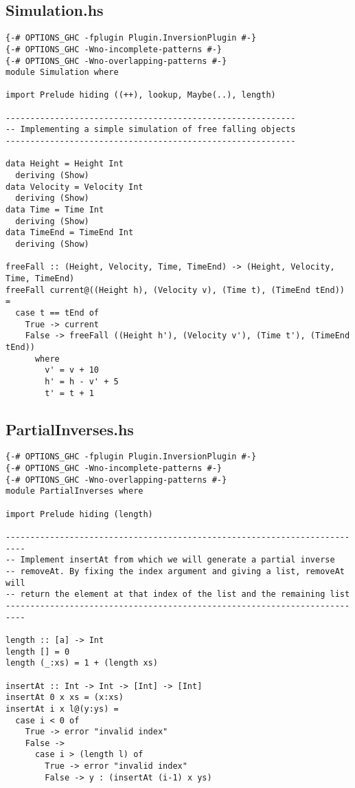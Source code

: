 \subsection{Simulation.hs}
\label{A:sim}

\begin{verbatim}
{-# OPTIONS_GHC -fplugin Plugin.InversionPlugin #-}
{-# OPTIONS_GHC -Wno-incomplete-patterns #-}
{-# OPTIONS_GHC -Wno-overlapping-patterns #-}
module Simulation where

import Prelude hiding ((++), lookup, Maybe(..), length)

-----------------------------------------------------------
-- Implementing a simple simulation of free falling objects
-----------------------------------------------------------

data Height = Height Int
  deriving (Show)
data Velocity = Velocity Int
  deriving (Show)
data Time = Time Int
  deriving (Show)
data TimeEnd = TimeEnd Int
  deriving (Show)

freeFall :: (Height, Velocity, Time, TimeEnd) -> (Height, Velocity, Time, TimeEnd)
freeFall current@((Height h), (Velocity v), (Time t), (TimeEnd tEnd)) =
  case t == tEnd of
    True -> current
    False -> freeFall ((Height h'), (Velocity v'), (Time t'), (TimeEnd tEnd))
      where
        v' = v + 10
        h' = h - v' + 5
        t' = t + 1
\end{verbatim}





\subsection{PartialInverses.hs}
\label{A:part_inv}

\begin{verbatim}
{-# OPTIONS_GHC -fplugin Plugin.InversionPlugin #-}
{-# OPTIONS_GHC -Wno-incomplete-patterns #-}
{-# OPTIONS_GHC -Wno-overlapping-patterns #-}
module PartialInverses where

import Prelude hiding (length)

--------------------------------------------------------------------------
-- Implement insertAt from which we will generate a partial inverse
-- removeAt. By fixing the index argument and giving a list, removeAt will
-- return the element at that index of the list and the remaining list
--------------------------------------------------------------------------

length :: [a] -> Int
length [] = 0
length (_:xs) = 1 + (length xs)

insertAt :: Int -> Int -> [Int] -> [Int]
insertAt 0 x xs = (x:xs)
insertAt i x l@(y:ys) =
  case i < 0 of
    True -> error "invalid index"
    False ->
      case i > (length l) of
        True -> error "invalid index"
        False -> y : (insertAt (i-1) x ys)
\end{verbatim}




